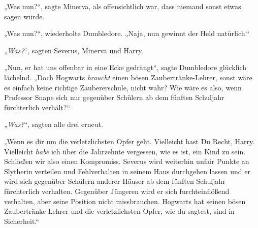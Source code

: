 „Was nun?“, sagte Minerva, als offensichtlich war, dass niemand sonst etwas sagen würde.

„Was nun?“, wiederholte Dumbledore. „Naja, nun gewinnt der Held natürlich.“

„\emph{Was?}“, sagten Severus, Minerva und Harry.

„Nun, er hat uns offenbar in eine Ecke gedrängt“, sagte Dumbledore glücklich lächelnd. „Doch Hogwarts \emph{braucht} einen bösen Zaubertränke-Lehrer, sonst wäre es einfach keine richtige Zaubererschule, nicht wahr? Wie wäre es also, wenn Professor Snape sich nur gegenüber Schülern ab dem fünften Schuljahr fürchterlich verhält?“

„\emph{Was?}“, sagten alle drei erneut.

„Wenn es dir um die verletzlichsten Opfer geht. Vielleicht hast Du Recht, Harry. Vielleicht \emph{habe} ich über die Jahrzehnte vergessen, wie es ist, ein Kind zu sein. Schließen wir also einen Kompromiss. Severus wird weiterhin unfair Punkte an Slytherin verteilen und Fehlverhalten in seinem Haus durchgehen lassen und er wird sich gegenüber Schülern anderer Häuser ab dem fünften Schuljahr fürchterlich verhalten. Gegenüber Jüngeren wird er sich furchteinflößend verhalten, aber seine Position nicht missbrauchen. Hogwarts hat seinen bösen Zaubertränke-Lehrer und die verletzlichsten Opfer, wie du sagtest, sind in Sicherheit.“

